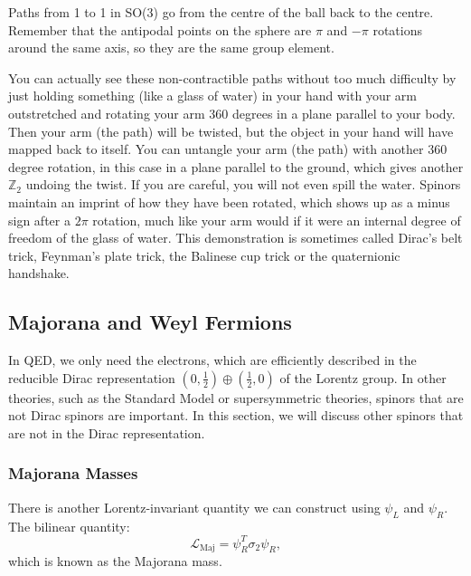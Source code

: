 \documentclass[11pt]{article}
\theoremstyle{definition}
\begin{document}
Paths from 1 to 1 in SO(3) go from the centre of the ball back to the centre. Remember that the antipodal points on the sphere are \(\pi\) and \(-\pi\) rotations around the same axis, so they are the same group element.

You can actually see these non-contractible paths without too much difficulty by just holding something (like a glass of water) in your hand with your arm outstretched and rotating your arm 360 degrees in a plane parallel to your body. Then your arm (the path) will be twisted, but the object in your hand will have mapped back to itself. You can untangle your arm (the path) with another 360 degree rotation, in this case in a plane parallel to the ground, which gives another \(\mathbb{Z}_2\) undoing the twist. If you are careful, you will not even spill the water. Spinors maintain an imprint of how they have been rotated, which shows up as a minus sign after a \(2\pi\) rotation, much like your arm would if it were an internal degree of freedom of the glass of water. This demonstration is sometimes called Dirac's belt trick, Feynman's plate trick, the Balinese cup trick or the quaternionic handshake.



\subsection{Majorana and Weyl Fermions}
In QED, we only need the electrons, which are efficiently described in the reducible Dirac representation $(0,\frac{1}{2})\oplus(\frac{1}{2},0)$ of the Lorentz group. In other theories, such as the Standard Model or supersymmetric theories, spinors that are not Dirac spinors are important. In this section, we will discuss other spinors that are not in the Dirac representation.


\subsubsection{Majorana Masses}
There is another Lorentz-invariant quantity we can construct using $\psi_L$ and $\psi_R$. The bilinear quantity:
\begin{equation}
    \mathcal{L}_\text{Maj} = \psi_R^T\sigma_2\psi_R,
\end{equation}
which is known as the Majorana mass.
\end{document}
